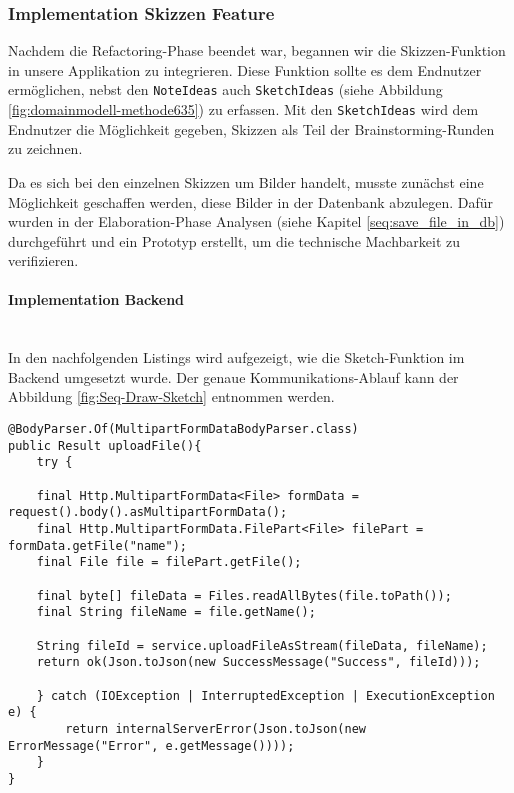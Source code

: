\subsubsection{Implementation Skizzen Feature}
Nachdem die Refactoring-Phase beendet war, begannen wir die Skizzen-Funktion in unsere Applikation zu integrieren. Diese Funktion sollte es dem Endnutzer ermöglichen, nebst den \texttt{NoteIdeas} auch \texttt{SketchIdeas} (siehe Abbildung \ref{fig:domainmodell-methode635}) zu erfassen. Mit den \texttt{SketchIdeas} wird dem Endnutzer die Möglichkeit gegeben, Skizzen als Teil der Brainstorming-Runden zu zeichnen.

Da es sich bei den einzelnen Skizzen um Bilder handelt, musste zunächst eine Möglichkeit geschaffen werden, diese Bilder in der Datenbank abzulegen. Dafür wurden in der Elaboration-Phase Analysen (siehe Kapitel \ref{seq:save_file_in_db}) durchgeführt und ein Prototyp erstellt, um die technische Machbarkeit zu verifizieren.

\paragraph*{Implementation Backend}~\\
In den nachfolgenden Listings wird aufgezeigt, wie die Sketch-Funktion im Backend umgesetzt wurde.
Der genaue Kommunikations-Ablauf kann der Abbildung \ref{fig:Seq-Draw-Sketch} entnommen werden.

\begin{lstlisting}[caption={Upload File im File Controller}, label=uploadFileController]
@BodyParser.Of(MultipartFormDataBodyParser.class)
public Result uploadFile(){
    try {

    final Http.MultipartFormData<File> formData = request().body().asMultipartFormData();
    final Http.MultipartFormData.FilePart<File> filePart = formData.getFile("name");
    final File file = filePart.getFile();

    final byte[] fileData = Files.readAllBytes(file.toPath());
    final String fileName = file.getName();

    String fileId = service.uploadFileAsStream(fileData, fileName);
    return ok(Json.toJson(new SuccessMessage("Success", fileId)));

    } catch (IOException | InterruptedException | ExecutionException  e) {
        return internalServerError(Json.toJson(new ErrorMessage("Error", e.getMessage())));
    }
}
\end{lstlisting}

